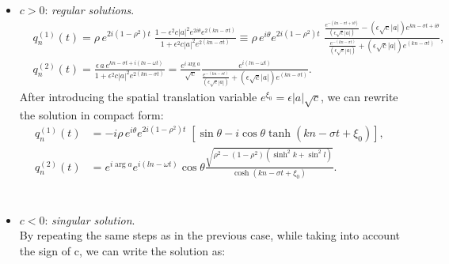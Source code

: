 \documentclass{article}
\begin{document}
\begin{itemize}
    \item $c>0$: \textit{regular solutions}.
    \begin{equation}
\begin{split}
 &   q^{(1)}_n(t)=\rho\,e^{2i(1-\rho^2) t}\;\frac{1-\epsilon^2c |a|^2e^{2i\theta} e^{2(k n-\sigma t)} }{1+\epsilon^2 c |a|^2  e^{2(k n-\sigma t)}}
 \equiv \rho\,e^{i\theta}e^{2i(1-\rho^2) t}\;\frac{\frac{e^{-(k n-\sigma t+i\theta)}}{(\epsilon \sqrt{c}|a|)}-(\epsilon \sqrt{c}|a|) e^{k n-\sigma t+i\theta} }{\frac{e^{-(k n-\sigma t)}}{(\epsilon \sqrt{c}|a|)}+(\epsilon \sqrt{c}|a|) e^{(k n-\sigma t)}},\\[3mm]
 &   q^{(2)}_n(t)=\frac{\epsilon \,a\, e^{k n-\sigma t+i(l n-\omega t)}}{1+\epsilon^2 c |a|^2  e^{2(k n-\sigma t)} }=\frac{e^{i\arg a}}{\sqrt{c}}\frac{e^{i(l n-\omega t)}}{\frac{e^{-(k n-\sigma t)}}{(\epsilon \sqrt{c}|a|)}+(\epsilon \sqrt{c}|a|) e^{(k n-\sigma t)} }.
    \end{split}
\end{equation}
After introducing the spatial translation variable $e^{\xi_0}=\epsilon |a|\sqrt{c}$, we can rewrite the solution in compact form:
    \begin{equation}
\begin{split}
    q^{(1)}_n(t)&=
-i\rho\,e^{i\theta}e^{2i(1-\rho^2) t}\;\left[\sin\theta-i\cos\theta\tanh(k n-\sigma t+\xi_0)\right],\\[3mm]
    q^{(2)}_n(t) &=e^{i\arg a}e^{i(l n-\omega t)}\cos\theta \frac{\sqrt{\rho^2-(1-\rho^2)(\sinh^2k+\sin^2l)}}{\cosh\left(k n-\sigma t+\xi_0\right)}.\\
     \end{split}
\end{equation}\\
\item $c<0$: \textit{singular solution}.\\
By repeating the same steps as in the previous case, while taking into account the sign of c, we can write the solution as:\\
\begin{equation}
\begin{split}\label{dark_bright_singular}

\end{split}
\end{equation}
\end{itemize}
\end{document}
